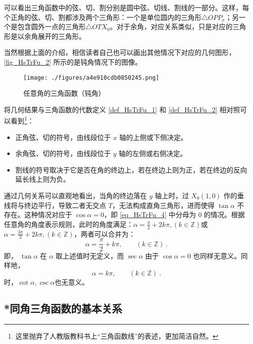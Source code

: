 可以看出三角函数中的弦、切、割分别是圆中弦、切线、割线的一部分。这样，每个正角的弦、切、割都涉及两个三角形：一个是单位圆内的三角形$\triangle OPP_x$；另一个是包含圆外一点的三角形$\triangle OTX_0$。对于余角，对应关系类似，只是对应的三角形是以余角展开的三角形。

当然根据上面的介绍，相信读者自己也可以画出其他情况下对应的几何图形，\autoref{fig_HsTrFu_2} 所示的是钝角情况下的图像。
\begin{figure}[ht]
\centering
\texttt{[image: ./figures/a4e910cdb0850245.png]}
\caption{任意角的三角函数（钝角）} \label{fig_HsTrFu_2}
\end{figure}
将几何结果与三角函数的代数定义 \autoref{def_HsTrFu_1} 和 \autoref{def_HsTrFu_2} 相对照可以看到\footnote{这里抛弃了人教版教科书上“三角函数线”的表述，更加简洁自然。}：
\begin{itemize}
\item 正角弦、切的符号，由线段位于 $x$ 轴的上侧或下侧决定。
\item 余角弦、切的符号，由线段位于 $y$ 轴的左侧或右侧决定。
\item 割线的符号取决于它是否在角的终边上，若在终边上则为正，若在终边的反向延长线上则为负。
\end{itemize}

通过几何关系可以直观地看出，当角的终边落在 $y$ 轴上时，过 $X_0(1,0)$ 作的垂线将与终边平行，导致二者无交点 $T$，无法构成直角三角形，进而使得 $\tan\alpha$ 不存在。这种情况对应于 $\cos\alpha = 0$，即 \autoref{eq_HsTrFu_4} 中分母为 $0$ 的情况。根据任意角的角度表示规则，此时的角度满足：$\displaystyle\alpha=\frac{\pi}{2}+2k\pi,(k\in\mathbb{Z})$或$\displaystyle\alpha=\frac{3\pi}{2}+2k\pi,(k\in\mathbb{Z})$，两者可以合并为：
\begin{equation}
\alpha=\frac{\pi}{2}+k\pi,\qquad(k\in\mathbb{Z})~.
\end{equation}
即， $\tan\alpha$ 在 $\alpha$ 取上述值时无定义，而 $\sec\alpha$ 由于 $\cos\alpha = 0$ 也同样无意义。同样地，
\begin{equation}
\alpha=k\pi,\qquad(k\in\mathbb{Z})~.
\end{equation}
时，$\cot\alpha,\csc\alpha$也无意义。

\subsection{*同角三角函数的基本关系}

